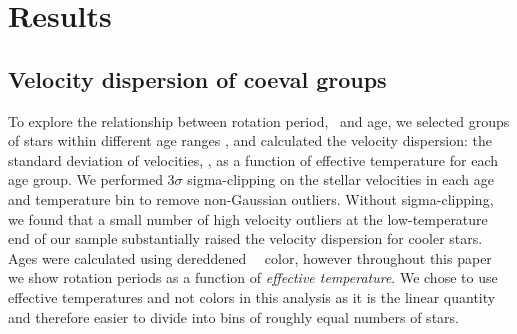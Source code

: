 \section{Results}
\label{sec:results}

\subsection{Velocity dispersion of coeval groups}

To explore the relationship between rotation period, \teff\ and age, we
selected groups of stars within different age ranges \citep[where age was
calculated using the][gyrochronology relation]{angus2019}, and calculated the
velocity dispersion: the standard deviation of velocities, \sigmavb, as a
function of effective temperature for each age group.
We performed 3$\sigma$ sigma-clipping on the stellar velocities in each age
and temperature bin to remove non-Gaussian outliers.
Without sigma-clipping, we found that a small number of high velocity
outliers at the low-temperature end of our sample substantially raised the
velocity dispersion for cooler stars.
Ages were calculated using dereddened \gaia\ \gcolor\ color, however
throughout this paper we show rotation periods as a function of {\it effective
temperature}.
We chose to use effective temperatures and not colors in this analysis as it
is the linear quantity and therefore easier to divide into bins of roughly
equal numbers of stars.

